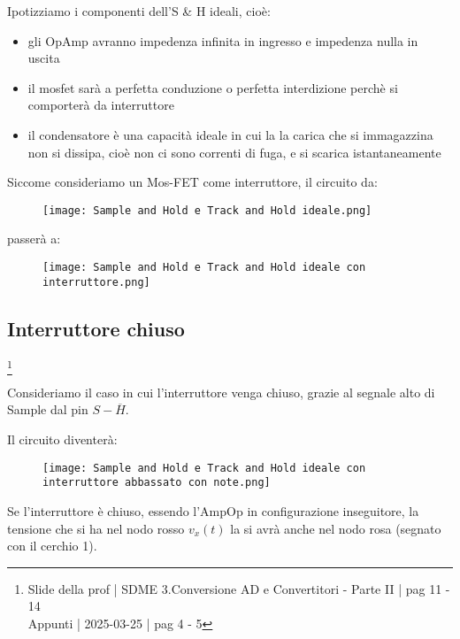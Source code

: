 Ipotizziamo i componenti dell'S \& H ideali, cioè: 

\begin{itemize}
    \item gli OpAmp avranno impedenza infinita in ingresso e impedenza nulla in uscita 
    \item il mosfet sarà a perfetta conduzione o perfetta interdizione perchè si comporterà da interruttore 
    \item il condensatore è una capacità ideale in cui la la carica che si immagazzina non si dissipa, cioè non ci sono correnti di fuga, e si scarica istantaneamente
\end{itemize}

Siccome consideriamo un Mos-FET come interruttore, il circuito da: 

\begin{figure}[h]
    \centering
    \texttt{[image: Sample and Hold e Track and Hold ideale.png]}
\end{figure}

passerà a: 

\begin{figure}[h]
    \centering
    \texttt{[image: Sample and Hold e Track and Hold ideale con interruttore.png]}
\end{figure}

\newpage 

\subsection{Interruttore chiuso} 
\footnote{Slide della prof | SDME 3.Conversione AD e Convertitori - Parte II | pag 11 - 14\\  
Appunti | 2025-03-25 | pag 4 - 5} 

Consideriamo il caso in cui l'interruttore venga chiuso, grazie al segnale alto di Sample 
dal pin $S-\overline{H}$. \newline 

Il circuito diventerà: 

\begin{figure}[h]
    \centering
    \texttt{[image: Sample and Hold e Track and Hold ideale con interruttore abbassato con note.png]}
\end{figure}

Se l'interruttore è chiuso, essendo l'AmpOp in configurazione inseguitore, 
la tensione che si ha nel nodo rosso $v_{x} (t)$ la si avrà anche nel nodo rosa (segnato con il cerchio 1). \newline 

